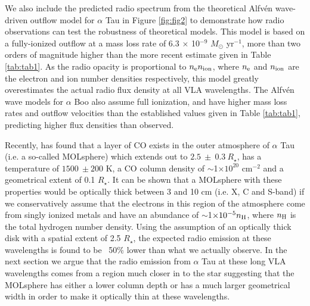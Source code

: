 \documentclass[iop]{emulateapj}
\begin{document}
We also include the predicted radio spectrum from the theoretical Alfv\'{e}n wave-driven outflow model for $\alpha$ Tau \citep{1989AcA....39..51K} in Figure \ref{fig:fig2} to demonstrate how radio observations can test the robustness of theoretical models. This model is based on a fully-ionized outflow at a mass loss rate of  6.3 $\times$ 10$^{-9}$ $M_{\odot}$ yr$^{-1}$, more than two orders of magnitude higher than the more recent estimate given in Table \ref{tab:tab1}. As the radio opacity is proportional to $n _{\rm{e}} n _{\rm{ion}}$, where $n_{\rm{e}}$ and $n_{\rm{ion}}$ are the electron and ion number densities respectively, this model greatly overestimates the actual radio flux density at all VLA wavelengths. The Alfv\'{e}n wave models for $\alpha$ Boo \citep{1988AcA....38..107K} also assume full ionization, and have higher mass loss rates and outflow velocities than the established values given in Table \ref{tab:tab1}, predicting higher flux densities than observed.

Recently, \cite{2013A&A...553A...3O} has found that a layer of CO exists in the outer atmosphere of $\alpha$ Tau (i.e. a so-called MOLsphere) which extends out to $2.5  \ \pm \ 0.3 \ R_{\star}$, has a temperature of $1500 \ \pm 200$ K, a CO column density of $\sim$1$\times 10^{20}$ cm$^{-2}$ and a geometrical extent of 0.1 $R_{\star}$. It can be shown that a MOLsphere with these properties would be optically thick between 3 and 10 cm (i.e. X, C and S-band) if we conservatively assume that the electrons in this region of the atmosphere come from singly ionized metals and have an abundance of $\sim$1$\times 10^{-5} n_{\rm{H}}$, where $n_{\rm{H}}$ is the total hydrogen number density. Using the assumption of an optically thick disk with a  spatial extent of 2.5 $R_{\star}$, the expected radio emission at these wavelengths is found to be ~50\% lower than what we actually observe. In the next section we argue that the radio emission from $\alpha$ Tau at these long VLA wavelengths comes from a region much closer in to the star suggesting that the MOLsphere has either a lower column depth or has a much larger geometrical width in order to make it optically thin at these wavelengths.
\end{document}
